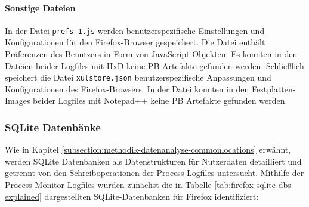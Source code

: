\begin{appendices}
		\paragraph*{Sonstige Dateien}
		In der Datei \texttt{prefs-1.js} werden benutzerspezifische Einstellungen und Konfigurationen für den Firefox-Browser gespeichert. Die Datei enthält Präferenzen des Benutzers in Form von JavaScript-Objekten. Es konnten in den Dateien beider Logfiles mit HxD keine PB Artefakte gefunden werden. 
		Schließlich speichert die Datei \texttt{xulstore.json} benutzerspezifische Anpassungen und Konfigurationen des Firefox-Browsers. In der Datei konnten in den Festplatten-Images beider Logfiles mit Notepad++ keine PB Artefakte gefunden werden. \cite{mozillazine.29.12.2022}
		
		\subsubsection*{SQLite Datenbänke}
		\label{appendix:firefox-sqlite}
		Wie in Kapitel \ref{subsection:methodik-datenanalyse-commonlocations} erwähnt, werden SQLite Datenbanken als Datenstrukturen für Nutzerdaten detailliert und getrennt von den Schreiboperationen der Process Logfiles untersucht. Mithilfe der Process Monitor Logfiles wurden zunächst die in Tabelle \ref{tab:firefox-sqlite-dbs-explained} dargestellten SQLite-Datenbanken für Firefox identifiziert:
		\begin{table}[h!]
			\centering
			\caption{Veränderte Firefox SQLite-Datenbänke und deren Verwendungszwecke}
			\label{tab:firefox-sqlite-dbs-explained}
\end{table}
\end{appendices}
